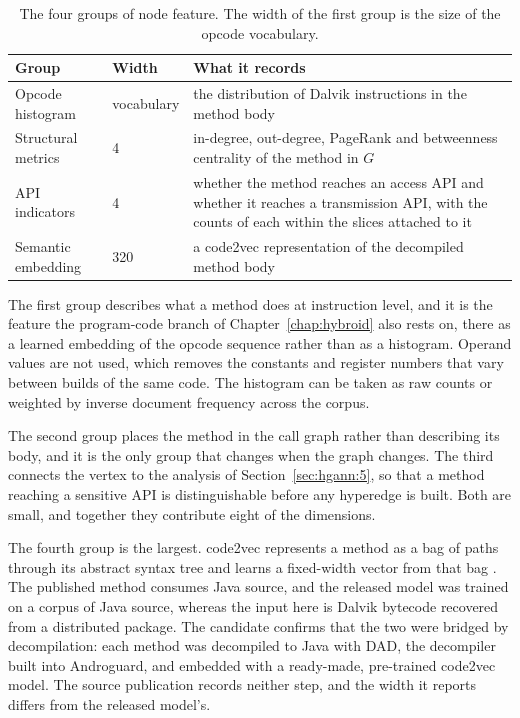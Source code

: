 \begin{table}
  \caption{The four groups of node feature. The width of the first group is the size of the
  opcode vocabulary.}
  \label{tab:hgann:features}
  \centering
  \begin{tabular}{llp{58mm}}
    \toprule
    Group & Width & What it records \\
    \midrule
    Opcode histogram   & vocabulary   & the distribution of Dalvik instructions in the method body \\
    Structural metrics & 4            & in-degree, out-degree, PageRank and betweenness centrality of the method in $G$ \\
    API indicators     & 4            & whether the method reaches an access API and whether it reaches a transmission API, with the counts of each within the slices attached to it \\
    Semantic embedding & 320          & a code2vec representation of the decompiled method body \\
    \bottomrule
  \end{tabular}
\end{table}

The first group describes what a method does at instruction level, and it is the feature the
program-code branch of Chapter~\ref{chap:hybroid} also rests on, there as a learned embedding of
the opcode sequence rather than as a histogram. Operand values are not used, which removes the
constants and register numbers that vary between builds of the same code. The histogram can be
taken as raw counts or weighted by inverse document frequency across the corpus.

The second group places the method in the call graph rather than describing its body, and it is
the only group that changes when the graph changes. The third connects the vertex to the analysis
of Section~\ref{sec:hgann:5}, so that a method reaching a sensitive API is distinguishable before
any hyperedge is built. Both are small, and together they contribute eight of the dimensions.

The fourth group is the largest. code2vec represents a method as a bag of paths through its
abstract syntax tree and learns a fixed-width vector from that bag \cite{alon2019code2vec}. The
published method consumes Java source, and the released model was trained on a corpus of Java
source, whereas the input here is Dalvik bytecode recovered from a distributed package. The
candidate confirms that the two were bridged by decompilation: each method was decompiled to Java
with DAD, the decompiler built into Androguard, and embedded with a ready-made, pre-trained
code2vec model. The source publication records neither step, and the width it reports differs
from the released model's.

